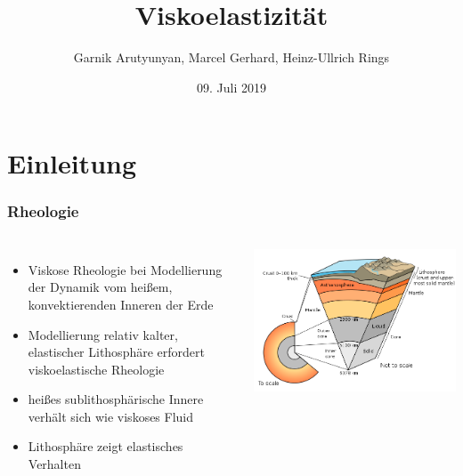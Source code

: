 \documentclass{beamer}
\author{Garnik Arutyunyan, Marcel Gerhard, Heinz-Ullrich Rings}
\title[Modellierungspraktikum]{Viskoelastizität}
\institute{Johannes-Gutenberg Universität Mainz}
\date{09. Juli 2019}
\begin{document}
 
 
 \begin{frame}
 \titlepage
 \end{frame}
 
 \begin{frame}
 	\tableofcontents
 \end{frame}
% 
\section{Einleitung}
\begin{frame}
\frametitle{Rheologie}
 \begin{columns}
\begin{itemize}
	\item Viskose Rheologie bei Modellierung der Dynamik vom heißem, konvektierenden Inneren der Erde
	\item Modellierung relativ kalter, elastischer Lithosphäre erfordert viskoelastische Rheologie
	\item heißes sublithosphärische Innere verhält sich wie viskoses Fluid
	\item Lithosphäre zeigt elastisches Verhalten  
\end{itemize}
\includegraphics[scale=0.3]{585px-Earth_cutaway_schematic-en.png}
\end{columns}
	
\end{frame}
	
\end{document}
